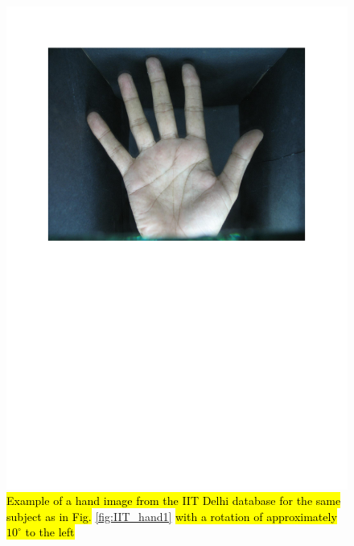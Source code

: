 \documentclass[review]{elsarticle}
\begin{document}
		\begin{figure}[!h]
		    \centering
		    \includegraphics[page=3,scale=.57,trim=1cm 14.7cm 1cm 1.7cm,clip]{IIT_samples.pdf}
		    \caption{\hl{Example of a hand image from the IIT Delhi database for the same subject as in Fig.} \ref{fig:IIT_hand1} \hl{with a rotation of approximately $10^{\circ}$ to the left}}
		    \label{fig:IIT_hand2}
		\end{figure}
\end{document}
